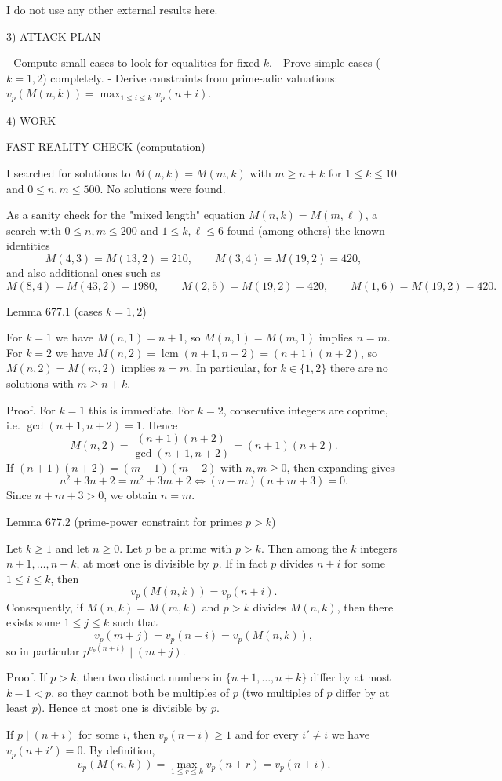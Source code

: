 I do not use any other external results here.

3) ATTACK PLAN

- Compute small cases to look for equalities for fixed $k$.
- Prove simple cases ($k=1,2$) completely.
- Derive constraints from prime-adic valuations: $v_p(M(n,k))=\max_{1\le i\le k} v_p(n+i)$.

4) WORK

FAST REALITY CHECK (computation)

I searched for solutions to $M(n,k)=M(m,k)$ with $m\ge n+k$ for $1\le k\le 10$ and $0\le n,m\le 500$. No solutions were found.

As a sanity check for the "mixed length" equation $M(n,k)=M(m,\ell)$, a search with $0\le n,m\le 200$ and $1\le k,\ell\le 6$ found (among others) the known identities
\[
M(4,3)=M(13,2)=210,\qquad M(3,4)=M(19,2)=420,
\]
and also additional ones such as
\[
M(8,4)=M(43,2)=1980,\qquad M(2,5)=M(19,2)=420,\qquad M(1,6)=M(19,2)=420.
\]

Lemma 677.1 (cases $k=1,2$)

For $k=1$ we have $M(n,1)=n+1$, so $M(n,1)=M(m,1)$ implies $n=m$.
For $k=2$ we have $M(n,2)=\operatorname{lcm}(n+1,n+2)=(n+1)(n+2)$, so $M(n,2)=M(m,2)$ implies $n=m$.
In particular, for $k\in\{1,2\}$ there are no solutions with $m\ge n+k$.

Proof.
For $k=1$ this is immediate.
For $k=2$, consecutive integers are coprime, i.e. $\gcd(n+1,n+2)=1$. Hence
\[
M(n,2)=\frac{(n+1)(n+2)}{\gcd(n+1,n+2)}=(n+1)(n+2).
\]
If $(n+1)(n+2)=(m+1)(m+2)$ with $n,m\ge 0$, then expanding gives
\[
 n^2+3n+2=m^2+3m+2\iff (n-m)(n+m+3)=0.
\]
Since $n+m+3>0$, we obtain $n=m$.


Lemma 677.2 (prime-power constraint for primes $p>k$)

Let $k\ge 1$ and let $n\ge 0$. Let $p$ be a prime with $p>k$. Then among the $k$ integers $n+1,\dots,n+k$, at most one is divisible by $p$.
If in fact $p$ divides $n+i$ for some $1\le i\le k$, then
\[
 v_p(M(n,k))=v_p(n+i).
\]
Consequently, if $M(n,k)=M(m,k)$ and $p>k$ divides $M(n,k)$, then there exists some $1\le j\le k$ such that
\[
 v_p(m+j)=v_p(n+i)=v_p(M(n,k)),
\]
so in particular $p^{v_p(n+i)}\mid (m+j)$.

Proof.
If $p>k$, then two distinct numbers in $\{n+1,\dots,n+k\}$ differ by at most $k-1<p$, so they cannot both be multiples of $p$ (two multiples of $p$ differ by at least $p$). Hence at most one is divisible by $p$.

If $p\mid(n+i)$ for some $i$, then $v_p(n+i)\ge 1$ and for every $i'\ne i$ we have $v_p(n+i')=0$. By definition,
\[
 v_p(M(n,k))=\max_{1\le r\le k} v_p(n+r)=v_p(n+i).
\]

